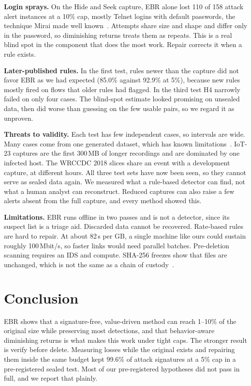 \documentclass[conference]{IEEEtran}
\begin{document}
\textbf{Login sprays.} On the Hide and Seek capture, EBR alone lost 110 of 158 attack alert instances at a 10\% cap, mostly Telnet logins with default passwords, the technique Mirai made well known~\cite{mirai}. Attempts share size and shape and differ only in the password, so diminishing returns treats them as repeats. This is a real blind spot in the component that does the most work. Repair corrects it when a rule exists.

\textbf{Later-published rules.} In the first test, rules newer than the capture did not favor EBR as we had expected (85.0\% against 92.9\% at 5\%), because new rules mostly fired on flows that older rules had flagged. In the third test H4 narrowly failed on only four cases. The blind-spot estimate looked promising on unsealed data, then did worse than guessing on the few usable pairs, so we regard it as unproven.

\textbf{Threats to validity.} Each test has few independent cases, so intervals are wide. Many cases come from one generated dataset, which has known limitations~\cite{troubleshooting}. IoT-23 captures are the first 300\,MB of longer recordings and are dominated by one infected host. The WRCCDC 2018 slices share an event with a development capture, at different hours. All three test sets have now been seen, so they cannot serve as sealed data again. We measured what a rule-based detector can find, not what a human analyst can reconstruct. Reduced captures can also raise a few alerts absent from the full capture, and every method showed this.

\textbf{Limitations.} EBR runs offline in two passes and is not a detector, since its suspect list is a triage aid. Discarded data cannot be recovered. Rate-based rules are hard to repair. At about 82\,s per GB, a single machine like ours could sustain roughly 100\,Mbit/s, so faster links would need parallel batches. Pre-deletion scanning requires an IDS and compute. SHA-256 freezes show that files are unchanged, which is not the same as a chain of custody~\cite{nist86}.

\section{Conclusion}
EBR shows that a signature-free, value-driven method can reach 1--10\% of the original size while preserving most detections, and that behavior-aware diminishing returns is what makes this work under tight caps. The stronger result is verify before delete. Measuring losses while the original exists and repairing them inside the same budget kept 99.6\% of attack signatures at a 5\% cap in a pre-registered sealed test. Most of our pre-registered hypotheses did not pass in full, and we report that plainly.
\end{document}
